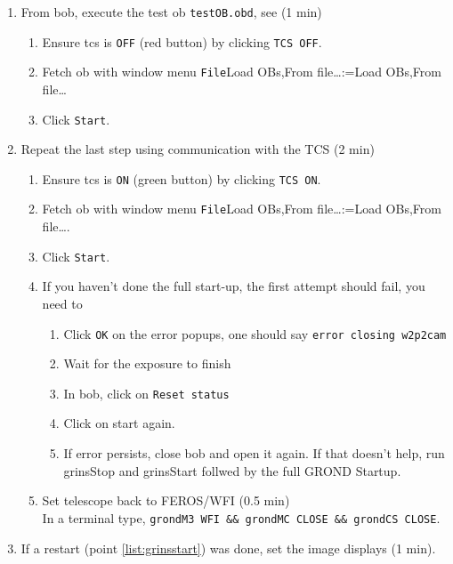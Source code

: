 \documentclass[11pt,fleqn,a4paper]{book}
\makeatletter
\def\menu#1#2{\texttt{#1}\ifx{}#2\else\@for\@x:=#2\do{$\rightarrow$\texttt{\@x}}\fi}
\def\wmenu#1#2{window menu \menu{#1}{#2}}
\makeatother
\begin{document}
\begin{enumerate}
\begin{enumerate}
\begin{enumerate}
           \end{enumerate}
         \item From \gls{bob}, execute the test \gls{ob} \texttt{testOB.obd}, see  (1 min)
           \begin{enumerate}
             \item Ensure \gls{tcs} is \texttt{OFF} (red button) by clicking \texttt{TCS OFF}.
             \item Fetch \gls{ob} with \wmenu{File}{Load OBs,From file…} 
             \item Click \texttt{Start}.
           \end{enumerate}
         \item Repeat the last step using communication with the TCS (2 min)\label{list:grond-testtcs}
           \begin{enumerate}
             \item Ensure \gls{tcs} is \texttt{ON} (green button) by clicking \texttt{TCS ON}.
             \item Fetch \gls{ob} with \wmenu{File}{Load OBs,From file…}.
             \item Click \texttt{Start}.
             \item If you haven't done the full start-up, the first attempt should fail, you need to
             \begin{enumerate}
                \item Click \texttt{OK} on the error popups, one should say \texttt{error closing \gls{w2p2cam}}
                \item Wait for the exposure to finish
                \item In \gls{bob}, click on \texttt{Reset status}
                \item Click on start again.
                \item If error persists, close \gls{bob} and open it again. If that doesn't help, run grinsStop and grinsStart follwed by the full GROND Startup.
             \end{enumerate} 
             \item Set telescope back to FEROS/WFI (0.5 min)\\
             In a terminal type, \texttt{\gls{grondM3} WFI \&\& \gls{grondMC} CLOSE \&\& \gls{grondCS} CLOSE}.
           \end{enumerate}
         \item If a restart (point \ref{list:grinsstart}) was done, set the image displays (1 min).

\end{enumerate}
\end{enumerate}
\end{document}
